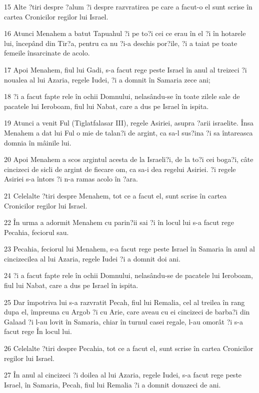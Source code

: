 \par 15 Alte ?tiri despre ?alum ?i despre razvratirea pe care a facut-o el sunt scrise în cartea Cronicilor regilor lui Israel.
\par 16 Atunci Menahem a batut Tapuahul ?i pe to?i cei ce erau în el ?i în hotarele lui, începând din Tir?a, pentru ca nu ?i-a deschis por?ile, ?i a taiat pe toate femeile însarcinate de acolo.
\par 17 Apoi Menahem, fiul lui Gadi, s-a facut rege peste Israel în anul al treizeci ?i noualea al lui Azaria, regele Iudei, ?i a domnit în Samaria zece ani;
\par 18 ?i a facut fapte rele în ochii Domnului, nelasându-se în toate zilele sale de pacatele lui Ieroboam, fiul lui Nabat, care a dus pe Israel în ispita.
\par 19 Atunci a venit Ful (Tiglatfalasar III), regele Asiriei, asupra ?arii israelite. Însa Menahem a dat lui Ful o mie de talan?i de argint, ca sa-l sus?ina ?i sa întareasca domnia în mâinile lui.
\par 20 Apoi Menahem a scos argintul acesta de la Israeli?i, de la to?i cei boga?i, câte cincizeci de sicli de argint de fiecare om, ca sa-i dea regelui Asiriei. ?i regele Asiriei s-a întors ?i n-a ramas acolo în ?ara.
\par 21 Celelalte ?tiri despre Menahem, tot ce a facut el, sunt scrise în cartea Cronicilor regilor lui Israel.
\par 22 În urma a adormit Menahem cu parin?ii sai ?i în locul lui s-a facut rege Pecahia, feciorul sau.
\par 23 Pecahia, feciorul lui Menahem, s-a facut rege peste Israel în Samaria în anul al cincizecilea al lui Azaria, regele Iudei ?i a domnit doi ani.
\par 24 ?i a facut fapte rele în ochii Domnului, nelasându-se de pacatele lui Ieroboam, fiul lui Nabat, care a dus pe Israel în ispita.
\par 25 Dar împotriva lui s-a razvratit Pecah, fiul lui Remalia, cel al treilea în rang dupa el, împreuna cu Argob ?i cu Arie, care aveau cu ei cincizeci de barba?i din Galaad ?i l-au lovit în Samaria, chiar în turnul casei regale, l-au omorât ?i s-a facut rege În locul lui.
\par 26 Celelalte ?tiri despre Pecahia, tot ce a facut el, sunt scrise în cartea Cronicilor regilor lui Israel.
\par 27 În anul al cincizeci ?i doilea al lui Azaria, regele Iudei, s-a facut rege peste Israel, în Samaria, Pecah, fiul lui Remalia ?i a domnit douazeci de ani.
